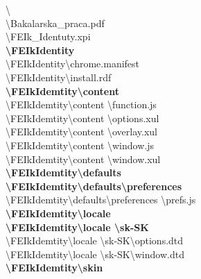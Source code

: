 \textbackslash \\
\textbackslash Bakalarska\_praca.pdf\\
\textbackslash FEIk\_Identuty.xpi\\
\textbf{\textbackslash FEIkIdentity}\\
\textbackslash FEIkIdentity\textbackslash chrome.manifest\\
\textbackslash FEIkIdentity\textbackslash install.rdf\\
\textbf{\textbackslash FEIkIdemtity\textbackslash content}\\
\textbackslash FEIkIdemtity\textbackslash content \textbackslash function.js\\
\textbackslash FEIkIdemtity\textbackslash content \textbackslash options.xul\\
\textbackslash FEIkIdemtity\textbackslash content \textbackslash overlay.xul\\
\textbackslash FEIkIdemtity\textbackslash content \textbackslash window.js\\
\textbackslash FEIkIdemtity\textbackslash content \textbackslash window.xul\\
\textbf{\textbackslash FEIkIdemtity\textbackslash defaults}\\
\textbf{\textbackslash FEIkIdemtity\textbackslash defaults\textbackslash preferences}\\
\textbackslash FEIkIdemtity\textbackslash defaults\textbackslash preferences \textbackslash prefs.js\\
\textbf{\textbackslash FEIkIdemtity\textbackslash locale}\\
\textbf{\textbackslash FEIkIdemtity\textbackslash locale \textbackslash sk-SK} \\
\textbackslash FEIkIdemtity\textbackslash locale \textbackslash sk-SK\textbackslash  options.dtd \\
\textbackslash FEIkIdemtity\textbackslash locale \textbackslash sk-SK\textbackslash  window.dtd \\
\textbf{\textbackslash FEIkIdemtity\textbackslash skin}\\

